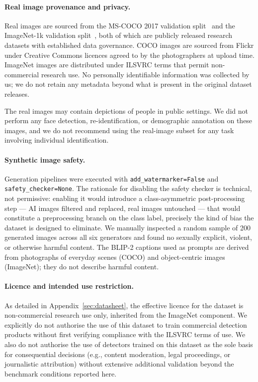 \paragraph{Real image provenance and privacy.}
Real images are sourced from the MS-COCO 2017 validation
split~\cite{lin2014coco} and the ImageNet-1k validation
split~\cite{deng2009imagenet}, both of which are publicly released
research datasets with established data governance.
COCO images are sourced from Flickr under Creative Commons licences
agreed to by the photographers at upload time.
ImageNet images are distributed under ILSVRC terms that permit
non-commercial research use.
No personally identifiable information was collected by us; we do not
retain any metadata beyond what is present in the original dataset
releases.

The real images may contain depictions of people in public settings.
We did not perform any face detection, re-identification, or
demographic annotation on these images, and we do not recommend using
the real-image subset for any task involving individual identification.

\paragraph{Synthetic image safety.}
Generation pipelines were executed with
\texttt{add\_watermarker=False} and \texttt{safety\_checker=None}.
The rationale for disabling the safety checker is technical, not
permissive: enabling it would introduce a class-asymmetric
post-processing step — AI images filtered and replaced, real images
untouched — that would constitute a preprocessing branch on the class
label, precisely the kind of bias the dataset is designed to
eliminate.
We manually inspected a random sample of 200 generated images across
all six generators and found no sexually explicit, violent, or
otherwise harmful content.
The BLIP-2 captions used as prompts are derived from photographs of
everyday scenes (COCO) and object-centric images (ImageNet); they do
not describe harmful content.

\paragraph{Licence and intended use restriction.}
As detailed in Appendix~\ref{sec:datasheet}, the effective licence
for the dataset is non-commercial research use only, inherited from
the ImageNet component.
We explicitly do not authorise the use of this dataset to train
commercial detection products without first verifying compliance with
the ILSVRC terms of use.
We also do not authorise the use of detectors trained on this dataset
as the sole basis for consequential decisions (e.g., content
moderation, legal proceedings, or journalistic attribution) without
extensive additional validation beyond the benchmark conditions
reported here.

